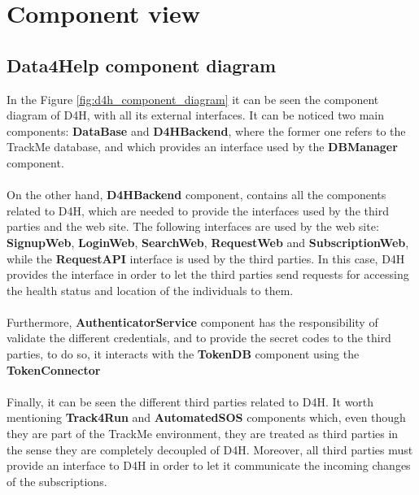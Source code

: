 \documentclass[a4paper, hidelinks, 12pt]{report}
\begin{document}
	\section{Component view}
		\subsection{Data4Help component diagram}
		In the Figure \ref{fig:d4h_component_diagram} it can be seen the component diagram of D4H, with all its external interfaces. It can be noticed two main components: \textbf{DataBase} and \textbf{D4HBackend}, where the former one refers to the TrackMe database, and which provides an interface used by the \textbf{DBManager} component. \\\\
		On the other hand, \textbf{D4HBackend} component, contains all the components related to D4H, which are needed to provide the interfaces used by the third parties and the web site. The following interfaces are used by the web site: \textbf{SignupWeb}, \textbf{LoginWeb}, \textbf{SearchWeb}, \textbf{RequestWeb} and  \textbf{SubscriptionWeb}, while the \textbf{RequestAPI} interface is used by the third parties. In this case, D4H provides the interface in order to let the third parties send requests for accessing the health status and location of the individuals to them.\\\\
		Furthermore, \textbf{AuthenticatorService} component has the responsibility of validate the different credentials, and to provide the secret codes to the third parties, to do so, it interacts with the \textbf{TokenDB} component using the \textbf{TokenConnector}\\\\
		Finally, it can be seen the different third parties related to D4H. It worth mentioning \textbf{Track4Run} and \textbf{AutomatedSOS} components which, even though they are part of the TrackMe environment, they are treated as third parties in the sense they are completely decoupled of D4H. Moreover, all third parties must provide an interface to D4H in order to let it communicate the incoming changes of the subscriptions.
		
\end{document}
